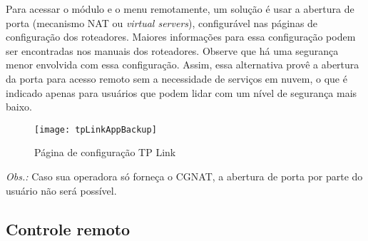 Para acessar o módulo e o menu remotamente, um solução é usar a abertura de porta (mecanismo NAT ou \emph{virtual servers}), configurável nas páginas de configuração dos roteadores. Maiores informações para essa configuração podem ser encontradas nos manuais dos roteadores. Observe que há uma segurança menor envolvida com essa configuração. Assim, essa alternativa provê a abertura da porta para acesso remoto sem a necessidade de serviços em nuvem, o que é indicado apenas para usuários que podem lidar com um nível de segurança mais baixo.

\begin{figure}[hbp]
    \centering
    \caption{Página de configuração TP Link}
    \texttt{[image: tpLinkAppBackup]}
    \label{fig:tpLinkAppBackup}
\end{figure}

\emph{Obs.:} Caso sua operadora só forneça o CGNAT, a abertura de porta por parte do usuário não será possível.

\subsection{Controle remoto}

